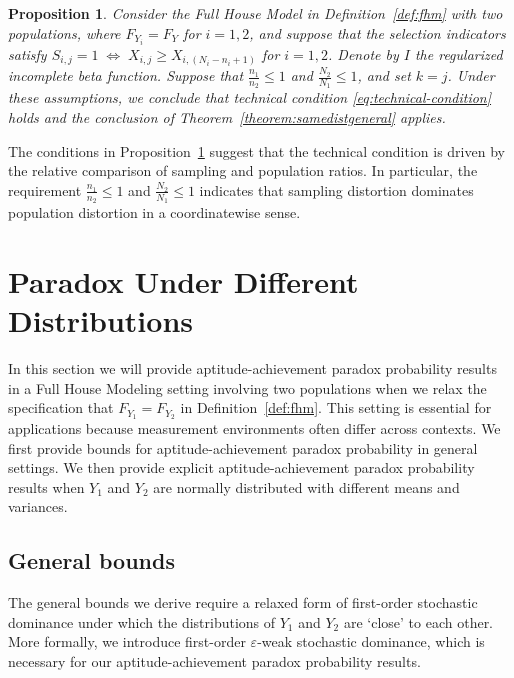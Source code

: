\documentclass[12pt]{article}
\newtheorem{prop}[theorem]{Proposition}
\begin{document}
\begin{prop} \label{prop:condition}
Consider the Full House Model in Definition~\ref{def:fhm} with two populations, where $F_{Y_i} = F_{Y}$ for $i=1,2$, and suppose that the selection indicators satisfy $S_{i,j} = 1 \;\Longleftrightarrow\; X_{i,j} \ge X_{i,(N_i - n_i + 1)}$ for $i=1,2$. Denote by $I$ the regularized incomplete beta function. Suppose that $\frac{n_1}{n_2}\leq 1$ and $\frac{N_2}{N_1} \leq 1$, and set $k = j$. Under these assumptions, we conclude that technical condition \eqref{eq:technical-condition} holds and the conclusion of Theorem~\ref{theorem:samedistgeneral} applies.	
\end{prop}

The conditions in Proposition~\ref{prop:condition} suggest that the technical condition is driven by the relative comparison of sampling and population ratios. In particular, the requirement $\frac{n_1}{n_2} \le 1$ and $\frac{N_2}{N_1} \le 1$ indicates that sampling distortion dominates population distortion in a coordinatewise sense. %


\section{Paradox Under Different Distributions}
\label{sec:diffdist}

In this section we will provide aptitude-achievement paradox probability results in a Full House Modeling setting involving two populations when we relax the specification that $F_{Y_1} = F_{Y_2}$ in Definition~\ref{def:fhm}. This setting is essential for applications because measurement environments often differ across contexts. We first provide bounds for aptitude-achievement paradox probability in general settings. We then provide explicit aptitude-achievement paradox probability results when $Y_1$ and $Y_2$ are normally distributed with different means and variances.

\subsection{General bounds}

The general bounds we derive require a relaxed form of first-order stochastic dominance under which the distributions of $Y_1$ and $Y_2$ are `close' to each other. More formally, we introduce first-order $\varepsilon$-weak stochastic dominance, which is necessary for our aptitude-achievement paradox probability results.
\end{document}
